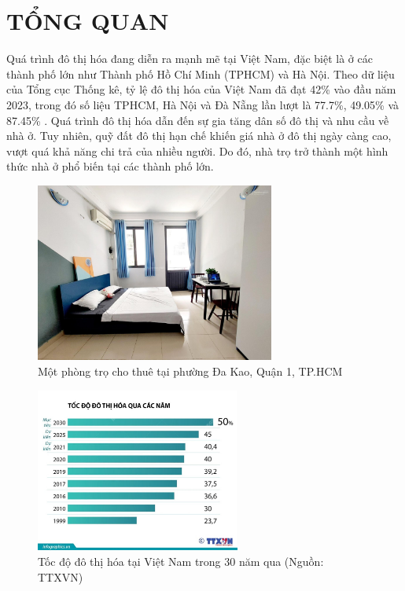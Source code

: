 \section{TỔNG QUAN}
\hspace*{1cm} Quá trình đô thị hóa đang diễn ra mạnh mẽ tại Việt Nam, đặc biệt là ở các thành phố lớn như Thành phố Hồ Chí Minh (TPHCM) và Hà Nội. Theo dữ liệu của Tổng cục Thống kê, tỷ lệ đô thị hóa của Việt Nam đã đạt 42\% vào đầu năm 2023, trong đó số liệu TPHCM, Hà Nội và Đà Nẵng lần lượt là 77.7\%, 49.05\% và 87.45\% \cite{tyledothihoa}. Quá trình đô thị hóa dẫn đến sự gia tăng dân số đô thị và nhu cầu về nhà ở. Tuy nhiên, quỹ đất đô thị hạn chế khiến giá nhà ở đô thị ngày càng cao, vượt quá khả năng chi trả của nhiều người. Do đó, nhà trọ trở thành một hình thức nhà ở phổ biến tại các thành phố lớn.
\begin{figure}[H]
    \centering
    \includegraphics[width=0.7\textwidth]{Images/Overview/PhongTro.jpg}
    \caption{Một phòng trọ cho thuê tại phường Đa Kao, Quận 1, TP.HCM}
\end{figure}
\begin{figure}[H]
    \centering
    \includegraphics[width=0.6\textwidth]{Images/Overview/TocDoDoThiHoa.jpg}
    \caption{Tốc độ đô thị hóa tại Việt Nam trong 30 năm qua (Nguồn: TTXVN)}
\end{figure}
